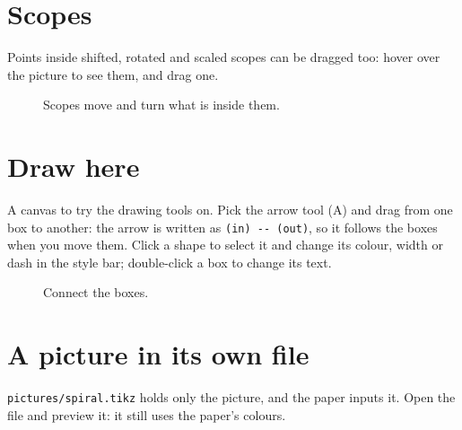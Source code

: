 \documentclass[11pt]{article}
\begin{document}
\section{Scopes}
Points inside shifted, rotated and scaled scopes can be dragged too: hover over the picture to
see them, and drag one.

\begin{figure}[ht]
  \centering
  \caption{Scopes move and turn what is inside them.}
  \label{fig:scopes}
\end{figure}

\section{Draw here}
A canvas to try the drawing tools on. Pick the arrow tool (A) and drag from one box to another:
the arrow is written as \texttt{(in) -{}- (out)}, so it follows the boxes when you move them.
Click a shape to select it and change its colour, width or dash in the style bar; double-click a
box to change its text.

\begin{figure}[ht]
  \centering
  \caption{Connect the boxes.}
  \label{fig:draw}
\end{figure}

\section{A picture in its own file}
\texttt{pictures/spiral.tikz} holds only the picture, and the paper inputs it. Open the file and
preview it: it still uses the paper's colours.
\end{document}

